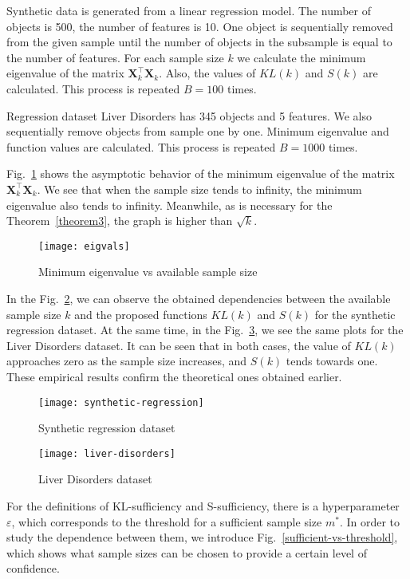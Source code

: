 \documentclass[runningheads]{llncs}
\begin{document}
Synthetic data is generated from a linear regression model. The number of objects is 500, the number of features is 10. One object is sequentially removed from the given sample until the number of objects in the subsample is equal to the number of features. For each sample size $k$ we calculate the minimum eigenvalue of the matrix $\mathbf{X}_k^\top \mathbf{X}_k$. Also, the values of $KL(k)$ and $S(k)$ are calculated. This process is repeated $B=100$ times.

Regression dataset Liver Disorders has 345 objects and 5 features. We also sequentially remove objects from sample one by one. Minimum eigenvalue and function values are calculated. This process is repeated $B=1000$ times.

Fig.~\ref{eigvals} shows the asymptotic behavior of the minimum eigenvalue of the matrix $\mathbf{X}_k^\top \mathbf{X}_k$. We see that when the sample size tends to infinity, the minimum eigenvalue also tends to infinity. Meanwhile, as is necessary for the Theorem~\ref{theorem3}, the graph is higher than $\sqrt{k}$.

\begin{figure}[ht]
    \centering
    \texttt{[image: eigvals]}
    \caption{Minimum eigenvalue vs available sample size}
    \label{eigvals}
\end{figure}

In the Fig.~\ref{synthetic-regression}, we can observe the obtained dependencies between the available sample size $k$ and the proposed functions $KL(k)$ and $S(k)$ for the synthetic regression dataset. At the same time, in the Fig.~\ref{liver-disorders}, we see the same plots for the Liver Disorders dataset. It can be seen that in both cases, the value of $KL(k)$ approaches zero as the sample size increases, and $S(k)$ tends towards one. These empirical results confirm the theoretical ones obtained earlier.

\begin{figure}[ht]
    \centering
    \texttt{[image: synthetic-regression]}
    \caption{Synthetic regression dataset}
    \label{synthetic-regression}
\end{figure}

\begin{figure}[ht]
    \centering
    \texttt{[image: liver-disorders]}
    \caption{Liver Disorders dataset}
    \label{liver-disorders}
\end{figure}

For the definitions of KL-sufficiency and S-sufficiency, there is a hyperparameter $\varepsilon$, which corresponds to the threshold for a sufficient sample size $m^*$. In order to study the dependence between them, we introduce Fig.~\ref{sufficient-vs-threshold}, which shows what sample sizes can be chosen to provide a certain level of confidence.
\end{document}
